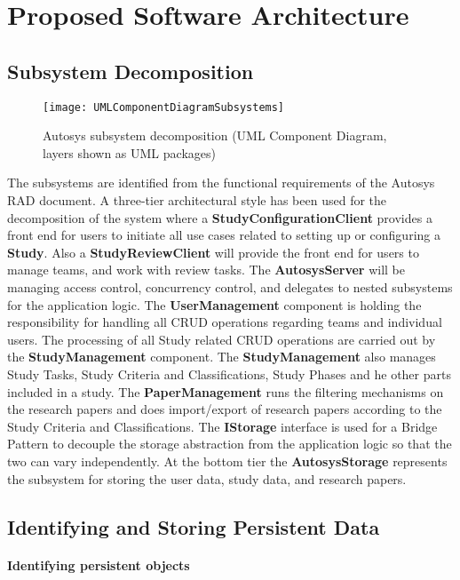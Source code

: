 \section{Proposed Software Architecture}
\subsection{Subsystem Decomposition}
\begin{figure}[H]
	\texttt{[image: UMLComponentDiagramSubsystems]}
	\caption{Autosys subsystem decomposition (UML Component Diagram, layers shown as UML packages)}
	\label{fig:Subsystem Decomposition, UML Component Diagram}
\end{figure}
The subsystems are identified from the functional requirements of the Autosys RAD document. A three-tier architectural style has been used for the decomposition of the system where a \textbf{StudyConfigurationClient} provides a front end for users to initiate all use cases related to setting up or configuring a \textbf{Study}. Also a \textbf{StudyReviewClient} will provide the front end for users to manage teams, and work with review tasks.
The \textbf{AutosysServer} will be managing access control, concurrency control, and delegates to nested subsystems for the application logic. The \textbf{UserManagement} component is holding the responsibility for handling all CRUD operations regarding teams and individual users. The processing of all Study related CRUD operations are carried out by the \textbf{StudyManagement} component. The  \textbf{StudyManagement} also manages Study Tasks, Study Criteria and Classifications, Study Phases and he other parts included in a study. The \textbf{PaperManagement} runs the filtering mechanisms on the research papers and does import/export of research papers according to the Study Criteria and Classifications.
The\textbf{ IStorage} interface is used for a Bridge Pattern to decouple the storage abstraction from the application logic so that the two can vary independently. At the bottom tier the \textbf{AutosysStorage} represents the subsystem for storing the user data, study data, and research papers.

\subsection{Identifying and Storing Persistent Data}
\paragraph{Identifying persistent objects}\mbox{}\\

